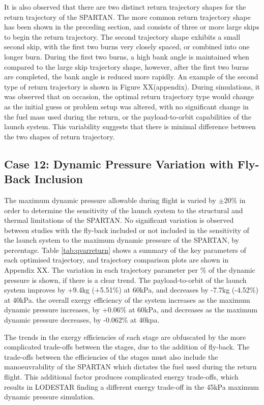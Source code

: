 It is also observed that there are two distinct return trajectory shapes for the return trajectory of the SPARTAN. The more common return trajectory shape has been shown in the preceding section, and consists of three or more large skips to begin the return trajectory. The second trajectory shape exhibits a small second skip, with the first two burns very closely spaced, or combined into one longer burn. During the first two burns, a high bank angle is maintained  when compared to the large skip trajectory shape, however, after the first two burns are completed, the bank angle is reduced more rapidly. 
An example of the second type of return trajectory is shown in Figure XX(appendix). 
During simulations, it was observed that on occasion, the optimal return trajectory type would change as the initial guess or problem setup was altered, with no significant change in the fuel mass used during the return, or the payload-to-orbit capabilities of the launch system. This variability suggests that there is minimal difference between the two shapes of return trajectory. 





\subsection{Case 12: Dynamic Pressure Variation with Fly-Back Inclusion}
The maximum dynamic pressure allowable during flight is varied by $\pm$20\% in order to determine the sensitivity of the launch system to the structural and thermal limitations of the SPARTAN. 
No significant variation is observed between studies with the fly-back included or not included in the sensitivity of the launch system to the maximum dynamic pressure of the SPARTAN, by percentage. 
Table \ref{tab:qvarreturn} shows a summary of the key parameters of each optimised trajectory, and trajectory comparison plots are shown in Appendix XX. The variation in each trajectory parameter per \% of the dynamic pressure is shown, if there is a clear trend. The payload-to-orbit of the launch system improves by +9.4kg (+5.51\%) at 60kPa, and decreases by -7.7kg (-4.52\%) at 40kPa.
the overall exergy efficiency of the system increases as the maximum dynamic pressure increases, by +0.06\% at 60kPa, and decreases as the maximum dynamic pressure decreases, by -0.062\% at 40kpa. 

The trends in the exergy efficiencies of each stage are obfuscated by the more complicated trade-offs between the stages, due to the addition of fly-back. The trade-offs between the efficiencies of the stages must also include the manoeuvrability of the SPARTAN which dictates the fuel used during the return flight. This additional factor produces complicated energy trade-offs, which results in LODESTAR finding a different energy trade-off in the 45kPa maximum dynamic pressure simulation. 

